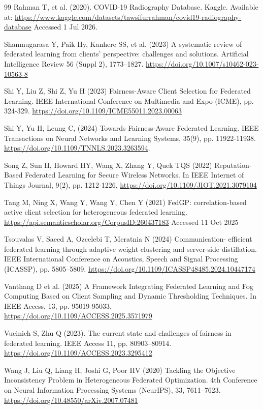 \documentclass[pdflatex,sn-mathphys-num,oneside]{sn-jnl}%
\theoremstyle{thmstyleone}%
\theoremstyle{thmstyletwo}%
\theoremstyle{thmstylethree}%
\begin{document}
\begin{thebibliography}{99}
Rahman T, et al. (2020). COVID-19 Radiography Database. Kaggle. Available at: \url{https://www.kaggle.com/datasets/tawsifurrahman/covid19-radiography-database} Accessed 1 Jul 2026.

Shanmugarasa Y, Paik Hy, Kanhere SS, et al. (2023) A systematic review of federated learning from clients’ perspective: challenges and solutions. Artificial Intelligence Review 56 (Suppl 2), 1773–1827. \url{https://doi.org/10.1007/s10462-023-10563-8}

Shi Y, Liu Z, Shi Z, Yu H (2023) Fairness-Aware Client Selection for Federated Learning. IEEE International Conference on Multimedia and Expo (ICME), pp. 324-329. \url{https://doi.org/10.1109/ICME55011.2023.00063}

Shi Y, Yu H, Leung C, (2024) Towards Fairness-Aware Federated Learning. IEEE Transactions on Neural Networks and Learning Systems, 35(9), pp. 11922-11938. \url{https://doi.org/10.1109/TNNLS.2023.3263594}.

Song Z, Sun H, Howard HY, Wang X, Zhang Y, Quek TQS (2022) Reputation-Based Federated Learning for Secure Wireless Networks. In IEEE Internet of Things Journal, 9(2), pp. 1212-1226, \url{https://doi.org/10.1109/JIOT.2021.3079104}

Tang M, Ning X, Wang Y, Wang Y, Chen Y (2021) FedGP: correlation-based active client selection for heterogeneous federated learning. \url{https://api.semanticscholar.org/CorpusID:260437183} Accessed 11 Oct 2025

Tsouvalas V, Saeed A, Ozcelebi T, Meratnia N (2024) Communication- efficient federated learning through adaptive weight clustering and server-side distillation. IEEE International Conference on Acoustics, Speech and Signal Processing (ICASSP), pp. 5805–5809. \url{https://doi.org/10.1109/ICASSP48485.2024.10447174}

Vanthang D et al. (2025) A Framework Integrating Federated Learning and Fog Computing Based on Client Sampling and Dynamic Thresholding Techniques. In IEEE Access, 13, pp. 95019-95033. \url{https://doi.org/10.1109/ACCESS.2025.3571979}

Vucinich S, Zhu Q (2023). The current state and challenges of fairness in federated learning. IEEE Access 11, pp. 80903–80914. \url{https://doi.org/10.1109/ACCESS.2023.3295412}

Wang J, Liu Q, Liang H, Joshi G, Poor HV (2020) Tackling the Objective Inconsistency Problem in Heterogeneous Federated Optimization. 4th Conference on Neural Information Processing Systems (NeurIPS), 33, 7611–7623. \url{https://doi.org/10.48550/arXiv.2007.07481}


\end{thebibliography}
\end{document}
